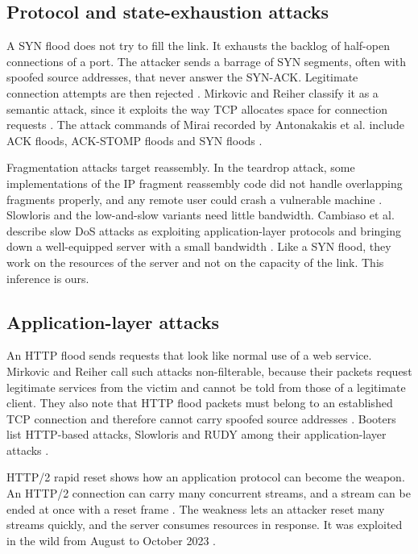 \subsection{Protocol and state-exhaustion attacks}
\label{sec:state-exhaustion-attacks}

A SYN flood does not try to fill the link. It exhausts the backlog of
half-open connections of a port. The attacker sends a barrage of SYN
segments, often with spoofed source addresses, that never answer the SYN-ACK.
Legitimate connection attempts are then rejected \citep{eddy2007rfc4987}.
Mirkovic and Reiher classify it as a semantic attack, since it exploits the
way TCP allocates space for connection requests
\citep{mirkovic2004taxonomy}. The attack commands of Mirai recorded by
Antonakakis et al. include ACK floods, ACK-STOMP floods and SYN floods
\citep{antonakakis2017mirai}.

Fragmentation attacks target reassembly. In the teardrop attack, some
implementations of the IP fragment reassembly code did not handle
overlapping fragments properly, and any remote user could crash a vulnerable
machine \citep{cert1997teardrop}.
Slowloris and the low-and-slow variants need little bandwidth. Cambiaso et
al. describe slow DoS attacks as exploiting application-layer protocols and
bringing down a well-equipped server with a small bandwidth
\citep{cambiaso2013slow}. Like a SYN flood, they work on the resources of the
server and not on the capacity of the link. This inference is ours.

\subsection{Application-layer attacks}
\label{sec:application-layer-attacks}

An HTTP flood sends requests that look like normal use of a web service.
Mirkovic and Reiher call such attacks non-filterable, because their packets
request legitimate services from the victim and cannot be told from those of
a legitimate client. They also note that HTTP flood packets must belong to an
established TCP connection and therefore cannot carry spoofed source
addresses \citep{mirkovic2004taxonomy}.
Booters list HTTP-based attacks, Slowloris and RUDY among their
application-layer attacks \citep{santanna2015inside}.

HTTP/2 rapid reset shows how an application protocol can become the weapon.
An HTTP/2 connection can carry many concurrent streams, and a stream can be
ended at once with a reset frame \citep{thomson2022rfc9113}. The weakness
lets an attacker reset many streams quickly, and the server consumes
resources in response. It was exploited in the wild from August to October
2023 \citep{nvd2023rapidreset}.

